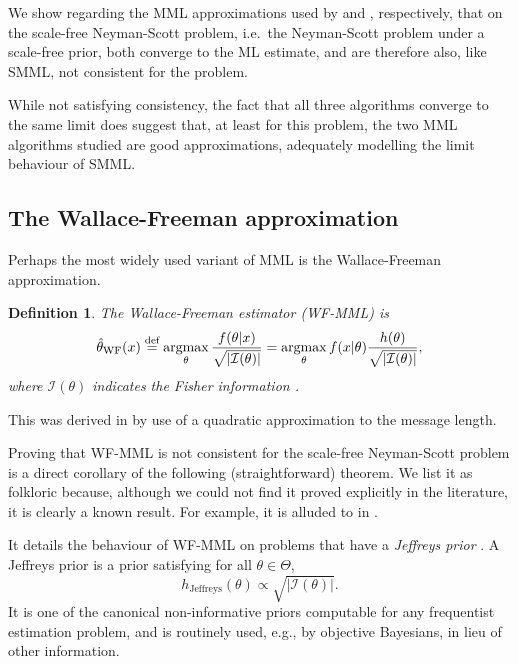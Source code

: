 \documentclass{IEEEtran}
\newcommand{\citet}[1]{\cite{#1}}
\newcommand{\citep}[1]{\cite{#1}}
\newcommand{\argmax}{\operatornamewithlimits{argmax}}
\newcommand{\defeq}{\stackrel{\text{def}}{=}}
\newtheorem{defi}{Definition}
\begin{document}
We show regarding the MML approximations used by
\citet{dowe1997resolving} and \citet{Wallace2005}, respectively, that on
the scale-free Neyman-Scott problem, i.e.\ the Neyman-Scott problem under
a scale-free prior, both converge to the ML estimate, and are therefore
also, like SMML, not consistent for the problem.

While not satisfying consistency, the fact that all three algorithms converge
to the same limit does suggest that, at least for this problem, the two
MML algorithms studied are good approximations, adequately modelling the
limit behaviour of SMML.

\subsection{The Wallace-Freeman approximation}\label{SS:WF}

Perhaps the most widely used variant of MML is the Wallace-Freeman
approximation.
\begin{defi}
\emph{The Wallace-Freeman estimator (WF-MML)} is
\begin{equation}\label{Eq:wf}
\hat{\theta}_{\text{WF}}(x)\defeq\argmax_{\theta}\frac{f(\theta|x)}{\sqrt{|\mathcal{I}(\theta)|}}
=\argmax_{\theta} f(x|\theta) \frac{h(\theta)}{\sqrt{|\mathcal{I}(\theta)|}},
\end{equation}
where $\mathcal{I}(\theta)$ indicates the
Fisher information \citep{lehmann2006theory, savage1976rereading}.
\end{defi}

This was derived in \citet{WallaceFreeman1987} by use of a quadratic
approximation to the message length.

Proving that WF-MML is not consistent for the scale-free Neyman-Scott problem
is a direct corollary of the following (straightforward) theorem.
We list it as folkloric because, although we could not
find it proved explicitly in the literature, it is clearly a known result.
For example, it is alluded to in \cite[p. 412]{Wallace2005}.

It details the behaviour of WF-MML on problems that have a
\emph{Jeffreys prior} \citep{Jeffreys1946invariant, Jeffreys1998theory}.
A Jeffreys prior is a prior satisfying for all
$\theta\in\Theta$,
\[
h_{\text{Jeffreys}}(\theta) \propto \sqrt{|\mathcal{I}(\theta)|}.
\]
It is one of the canonical non-informative priors computable for any
frequentist estimation problem, and is routinely used, e.g., by
objective Bayesians, in lieu of other information.
\end{document}
